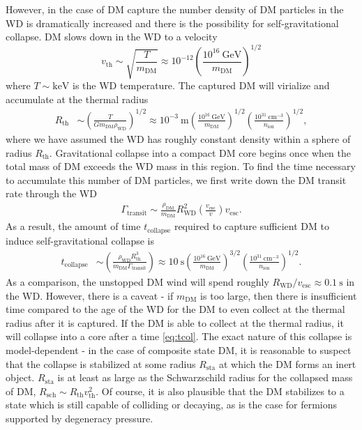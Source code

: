 \documentclass[twocolumn,preprintnumbers,amsmath,amssymb,prl, superscriptaddress]{revtex4}
\newcommand{\GeV}{\text{GeV}}
\newcommand{\keV}{\text{keV}}
\newcommand{\cm}{\text{cm}}
\def\r{\right)}
\def\l{\left(}
\begin{document}
However, in the case of DM capture the number density of DM particles in the WD is dramatically increased and there is the possibility for self-gravitational collapse.
DM slows down in the WD to a velocity
\begin{equation}
v_\text{th} \sim \sqrt{\frac{T}{m_\text{DM}}} \approx 10^{-12} \l \frac{10^{16} ~\GeV}{m_\text{DM}}\r^{1/2}
\end{equation}
where $T \sim \keV$ is the WD temperature.
The captured DM will virialize and accumulate at the thermal radius
\begin{align}
R_\text{th} &\sim \l \frac{T}{G m_\text{DM} \rho_\text{WD}}\r^{1/2} \approx 10^{-3} ~\text{m} \l \frac{10^{16} ~\GeV}{m_\text{DM}}\r^{1/2} \l \frac{10^{31} ~\cm^{-3}}{n_\text{ion}}\r^{1/2}, \nonumber
\end{align}
where we have assumed the WD has roughly constant density within a sphere of radius $R_\text{th}$.
Gravitational collapse into a compact DM core begins once when the total mass of DM exceeds the WD mass in this region.
To find the time necessary to accumulate this number of DM particles, we first write down the DM transit rate through the WD
\begin{align}
\Gamma_\text{transit} \sim \frac{\rho_{\text{DM}}}{m_\text{DM}} R_\text{WD}^2 \l\frac{v_\text{esc}}{v}\r v_\text{esc}.
\label{eq:TransitFluxCondition}
\end{align}
As a result, the amount of time $t_\text{collapse}$ required to capture sufficient DM to induce self-gravitational collapse is
\begin{align}
\label{eq:tcol}
t_\text{collapse} &\sim \l \frac{\rho_\text{WD} R_\text{th}^3}{m_\text{DM} \Gamma_\text{transit}} \r \approx 10 ~\text{s} \l \frac{10^{16} ~\GeV}{m_\text{DM}} \r^{3/2} \l \frac{10^{31} ~\cm^{-3}}{n_\text{ion}}\r^{1/2}.
\end{align}
As a comparison, the unstopped DM wind will spend roughly $R_\text{WD}/v_\text{esc} \approx 0.1 ~\text{s}$ in the WD.
However, there is a caveat - if $m_\text{DM}$ is too large, then there is insufficient time compared to the age of the WD for the DM to even collect at the thermal radius after it is captured.
If the DM is able to collect at the thermal radius, it will collapse into a core after a time \eqref{eq:tcol}.
The exact nature of this collapse is model-dependent - in the case of composite state DM, it is reasonable to suspect that the collapse is stabilized at some radius $R_\text{sta}$ at which the DM forms an inert object.
$R_\text{sta}$ is at least as large as the Schwarzschild radius for the collapsed mass of DM, $R_\text{sch} \sim R_\text{th} v_\text{th}^2$.
Of course, it is also plausible that the DM stabilizes to a state which is still capable of colliding or decaying, as is the case for fermions supported by degeneracy pressure.
\end{document}
